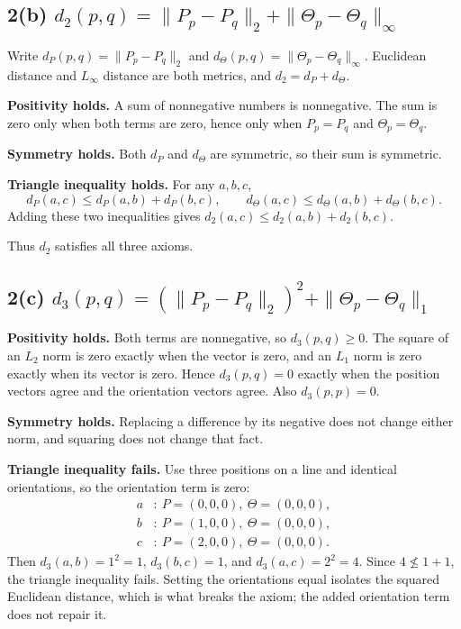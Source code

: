 \documentclass[11pt]{article}
\begin{document}
\subsection*{2(b) $d_2(p,q)=\|P_p-P_q\|_2+\|\Theta_p-\Theta_q\|_\infty$}

Write $d_P(p,q)=\|P_p-P_q\|_2$ and $d_\Theta(p,q)=\|\Theta_p-\Theta_q\|_\infty$. Euclidean distance and $L_\infty$ distance are both metrics, and $d_2=d_P+d_\Theta$.

\textbf{Positivity holds.} A sum of nonnegative numbers is nonnegative. The sum is zero only when both terms are zero, hence only when $P_p=P_q$ and $\Theta_p=\Theta_q$.

\textbf{Symmetry holds.} Both $d_P$ and $d_\Theta$ are symmetric, so their sum is symmetric.

\textbf{Triangle inequality holds.} For any $a,b,c$,
\[
d_P(a,c)\le d_P(a,b)+d_P(b,c), \qquad d_\Theta(a,c)\le d_\Theta(a,b)+d_\Theta(b,c).
\]
Adding these two inequalities gives $d_2(a,c)\le d_2(a,b)+d_2(b,c)$.

Thus $d_2$ satisfies all three axioms.

\subsection*{2(c) $d_3(p,q)=(\|P_p-P_q\|_2)^2+\|\Theta_p-\Theta_q\|_1$}

\textbf{Positivity holds.} Both terms are nonnegative, so $d_3(p,q)\ge 0$. The square of an $L_2$ norm is zero exactly when the vector is zero, and an $L_1$ norm is zero exactly when its vector is zero. Hence $d_3(p,q)=0$ exactly when the position vectors agree and the orientation vectors agree. Also $d_3(p,p)=0$.

\textbf{Symmetry holds.} Replacing a difference by its negative does not change either norm, and squaring does not change that fact.

\textbf{Triangle inequality fails.} Use three positions on a line and identical orientations, so the orientation term is zero:
\begin{align*}
a&:\ P=(0,0,0),\ \Theta=(0,0,0),\\
b&:\ P=(1,0,0),\ \Theta=(0,0,0),\\
c&:\ P=(2,0,0),\ \Theta=(0,0,0).
\end{align*}
Then $d_3(a,b)=1^2=1$, $d_3(b,c)=1$, and $d_3(a,c)=2^2=4$. Since $4\not\le 1+1$, the triangle inequality fails. Setting the orientations equal isolates the squared Euclidean distance, which is what breaks the axiom; the added orientation term does not repair it.
\end{document}
